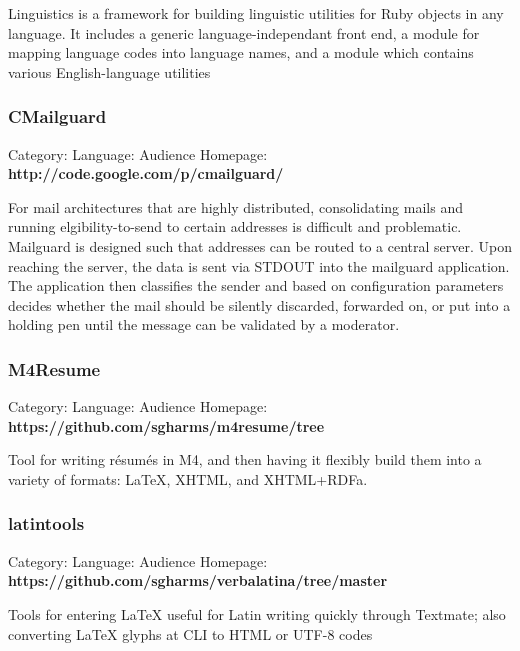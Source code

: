 \documentclass[]{article}
\begin{document}
Linguistics is a framework for building linguistic utilities for Ruby objects
in any language. It includes a generic language-independant front end, a
module for mapping language codes into language names, and a module which
contains various English-language utilities





\subsubsection*{CMailguard}
Category:  Language: Audience
Homepage: {\bf http://code.google.com/p/cmailguard/}
\vspace{0.05in}

For mail architectures that are highly distributed, consolidating mails and running elgibility-to-send to certain addresses is difficult and problematic.  Mailguard is designed such that addresses can be routed to a central server. Upon reaching the server, the data is sent via STDOUT into the mailguard application.  The application then classifies the sender and based on configuration parameters decides whether the mail should be silently discarded, forwarded on, or put into a holding pen until the message can be validated by a moderator.




\subsubsection*{M4Resume}
Category:  Language: Audience
Homepage: {\bf https://github.com/sgharms/m4resume/tree}
\vspace{0.05in}

Tool for writing résumés in M4, and then having it flexibly build them into a variety of formats:  LaTeX, XHTML, and XHTML+RDFa.




\subsubsection*{latintools}
Category:  Language: Audience
Homepage: {\bf https://github.com/sgharms/verbalatina/tree/master}
\vspace{0.05in}

Tools for entering LaTeX useful for Latin writing quickly through Textmate; also converting LaTeX glyphs at CLI to HTML or UTF-8 codes
\end{document}
